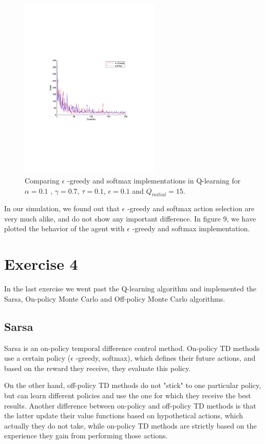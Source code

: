 \documentclass[a4paper,11pt]{article}
\begin{document}
\begin{figure}[b!]
  \centering
    \includegraphics[trim=4cm 8.5cm 4cm 8.5cm,clip,width=0.6\textwidth]{figures/egresoftcomp.pdf}
    \caption{Comparing $\epsilon$ -greedy and softmax implementations in Q-learning for $\alpha = 0.1$ , $\gamma = 0.7$, $\tau = 0.1$, $\epsilon = 0.1$ and $Q_{initial} = 15$.}
\end{figure}

In our simulation, we found out that $\epsilon$ -greedy and softmax action selection are very much alike, and do not show any important difference. In figure 9, we have plotted the behavior of the agent with $\epsilon$ -greedy and softmax implementation.



\section*{Exercise 4}
In the last exercise we went past the Q-learning algorithm and implemented the Sarsa, On-policy Monte Carlo and Off-policy Monte Carlo algorithms. 	
\subsection*{Sarsa}
Sarsa is an on-policy temporal difference control method. On-policy TD methods use a certain policy ($\epsilon$ -greedy, softmax), which defines their future actions, and based on the reward they receive, they evaluate this policy.

On the other hand, off-policy TD methods do not "stick" to one particular policy, but can learn different policies and use the one for which they receive the best results. Another difference between on-policy and off-policy TD methods is that the latter update their value functions based on hypothetical actions, which actually they do not take, while on-policy TD methods are strictly based on the experience they gain from performing those actions.
\end{document}
